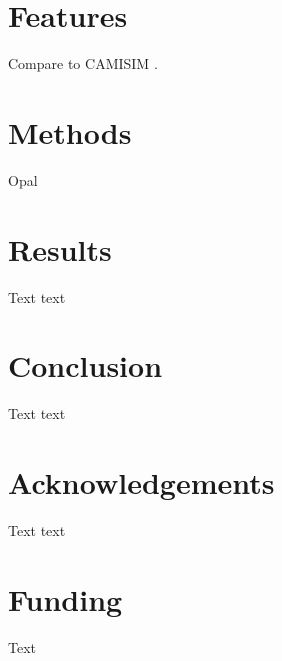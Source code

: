 \documentclass{bioinfo}
\begin{document}
\section{Features}

Compare to CAMISIM \cite{fritz2019camisim}.

\section{Methods}

Opal \cite{luo2018metagenomic}

\section{Results}

Text text

\section{Conclusion}

Text text

\section*{Acknowledgements}

Text text


\section*{Funding}

Text



%
%
%
%
%
%
%

\end{document}
